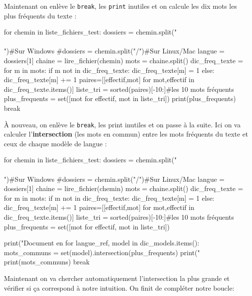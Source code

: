 Maintenant on enlève le \texttt{break}, les \texttt{print} inutiles et on calcule les dix mots les plus fréquents du texte : 

\begin{python}
for chemin in liste_fichiers_test:
  dossiers = chemin.split("\\\\")#Sur Windows
  #dossiers = chemin.split("/")#Sur Linux/Mac
  langue = dossiers[1]
  chaine = lire_fichier(chemin)
  mots = chaine.split()
  dic_freq_texte = {}
  for m in mots:
    if m not in dic_freq_texte:
      dic_freq_texte[m] = 1
    else:
      dic_freq_texte[m] += 1
  paires=[[effectif,mot] for mot,effectif in  dic_freq_texte.items()]
  liste_tri = sorted(paires)[-10:]#les 10 mots fréquents
  plus_frequents = set([mot for effectif, mot in liste_tri])
  print(plus_frequents)
  break
\end{python}

À nouveau, on enlève le \texttt{break}, les print inutiles et on passe à la suite. Ici on va calculer l'\textbf{intersection} (les mots en commun) entre les mots fréquents du texte et ceux de chaque modèle de langue :

\begin{python}
for chemin in liste_fichiers_test:
  dossiers = chemin.split("\\\\")#Sur Windows
  #dossiers = chemin.split("/")#Sur Linux/Mac
  langue = dossiers[1]
  chaine = lire_fichier(chemin)
  mots = chaine.split()
  dic_freq_texte = {}
  for m in mots:
    if m not in dic_freq_texte:
      dic_freq_texte[m] = 1
    else:
      dic_freq_texte[m] += 1
  paires=[[effectif,mot] for mot,effectif in  dic_freq_texte.items()]
  liste_tri = sorted(paires)[-10:]#les 10 mots fréquents
  plus_frequents = set([mot for effectif, mot in liste_tri])

  print("Document en %
  for langue_ref, model in dic_models.items():
    mots_communs = set(model).intersection(plus_frequents)
    print("%
    print(mots_communs)
  break
\end{python}

Maintenant on va chercher automatiquement l'intersection la plus grande et vérifier si ça correspond à notre intuition. On finit de compléter notre boucle:

